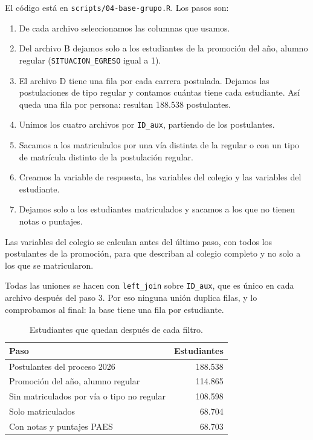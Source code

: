 \documentclass[11pt,letterpaper]{article}
\begin{document}
El código está en \texttt{scripts/04-base-grupo.R}. Los pasos son:

\begin{enumerate}
\item De cada archivo seleccionamos las columnas que usamos.
\item Del archivo B dejamos solo a los estudiantes de la promoción del año, alumno regular (\texttt{SITUACION\_EGRESO} igual a 1).
\item El archivo D tiene una fila por cada carrera postulada. Dejamos las postulaciones de tipo regular y contamos cuántas tiene cada estudiante. Así queda una fila por persona: resultan 188.538 postulantes.
\item Unimos los cuatro archivos por \texttt{ID\_aux}, partiendo de los postulantes.
\item Sacamos a los matriculados por una vía distinta de la regular o con un tipo de matrícula distinto de la postulación regular.
\item Creamos la variable de respuesta, las variables del colegio y las variables del estudiante.
\item Dejamos solo a los estudiantes matriculados y sacamos a los que no tienen notas o puntajes.
\end{enumerate}

Las variables del colegio se calculan antes del último paso, con todos los postulantes de la promoción, para que describan al colegio completo y no solo a los que se matricularon.

Todas las uniones se hacen con \texttt{left\_join} sobre \texttt{ID\_aux}, que es único en cada archivo después del paso 3. Por eso ninguna unión duplica filas, y lo comprobamos al final: la base tiene una fila por estudiante.

\begin{table}[h]
\centering
\begin{tabular}{lr}
\toprule
Paso & Estudiantes \\
\midrule
Postulantes del proceso 2026 & 188.538 \\
Promoción del año, alumno regular & 114.865 \\
Sin matriculados por vía o tipo no regular & 108.598 \\
Solo matriculados & 68.704 \\
Con notas y puntajes PAES & 68.703 \\
\bottomrule
\end{tabular}
\caption{Estudiantes que quedan después de cada filtro.}
\end{table}
\end{document}
